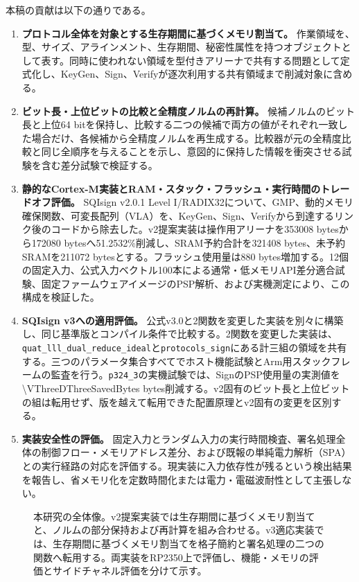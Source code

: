 \documentclass[a4paper,10pt]{ltjsarticle}
\theoremstyle{definition}
\theoremstyle{remark}
\begin{document}
本稿の貢献は以下の通りである。

\begin{enumerate}[leftmargin=2.2em]
  \item \textbf{プロトコル全体を対象とする生存期間に基づくメモリ割当て。}
        作業領域を、型、サイズ、アラインメント、生存期間、秘密性属性を持つオブジェクトとして表す。同時に使われない領域を型付きアリーナで共有する問題として定式化し、KeyGen、Sign、Verifyが逐次利用する共有領域まで削減対象に含める。
  \item \textbf{ビット長・上位ビットの比較と全精度ノルムの再計算。}
        候補ノルムのビット長と上位64 bitを保持し、比較する二つの候補で両方の値がそれぞれ一致した場合だけ、各候補から全精度ノルムを再生成する。比較器が元の全精度比較と同じ全順序を与えることを示し、意図的に保持した情報を衝突させる試験を含む差分試験で検証する。
  \item \textbf{静的なCortex-M実装とRAM・スタック・フラッシュ・実行時間のトレードオフ評価。}
        SQIsign v2.0.1 Level I/RADIX32について、GMP、動的メモリ確保関数、可変長配列（VLA）を、KeyGen、Sign、Verifyから到達するリンク後のコードから除去した。v2提案実装は操作用アリーナを\num{353008} bytesから\num{172080} bytesへ\num{51.2532}\%削減し、SRAM予約合計を\num{321408} bytes、未予約SRAMを\num{211072} bytesとする。フラッシュ使用量は\num{880} bytes増加する。12個の固定入力、公式入力ベクトル100本による通常・低メモリAPI差分適合試験、固定ファームウェアイメージのPSP解析、および実機測定により、この構成を検証した。
  \item \textbf{SQIsign v3への適用評価。}
        公式v3.0と2関数を変更した実装を別々に構築し、同じ基準版とコンパイル条件で比較する。2関数を変更した実装は、\texttt{quat\_lll\_dual\_reduce\_ideal}と\texttt{protocols\_sign}にある計三組の領域を共有する。三つのパラメータ集合すべてでホスト機能試験とArm用スタックフレームの監査を行う。\texttt{p324\_3}の実機試験では、SignのPSP使用量の実測値を\num{\VThreeDThreeSavedBytes} bytes削減する。v2固有のビット長と上位ビットの組は転用せず、版を越えて転用できた配置原理とv2固有の変更を区別する。
  \item \textbf{実装安全性の評価。}
        固定入力とランダム入力の実行時間検査、署名処理全体の制御フロー・メモリアドレス差分、および既報の単純電力解析（SPA）\cite{spa-2025}との実行経路の対応を評価する。現実装に入力依存性が残るという検出結果を報告し、省メモリ化を定数時間化または電力・電磁波耐性として主張しない。
\end{enumerate}

\begin{figure}[H]
  \centering
  
  \caption{本研究の全体像。v2提案実装では生存期間に基づくメモリ割当てと、ノルムの部分保持および再計算を組み合わせる。v3適応実装では、生存期間に基づくメモリ割当てを格子簡約と署名処理の二つの関数へ転用する。両実装をRP2350上で評価し、機能・メモリの評価とサイドチャネル評価を分けて示す。}
  \label{fig:overview}
\end{figure}
\end{document}
